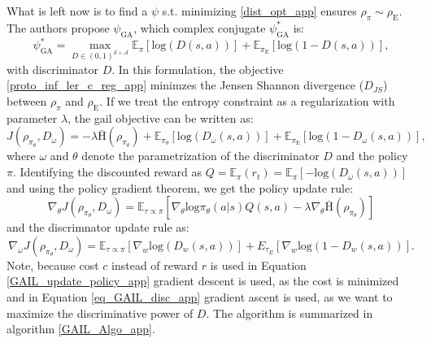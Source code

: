What is left now is to find a $\psi$ s.t. minimizing \ref{dist_opt_app} ensures $\rho_{\pi} \sim \rho_{\text{E}}$. The authors propose $\psi_{\text{GA}}$, 
which complex conjugate $\psi^*_{\text{GA}}$ is: 
\begin{equation}
    \psi^*_{\text{GA}} = \max_{D\in(0,1)^{\mathcal{S} \times \mathcal{A}}} \mathbb{E}_{\pi}\left[ \text{log}(D(s,a))\right] + \mathbb{E}_{\pi_{\text{E}}}\left[ \text{log}(1 - D(s,a))\right],
\end{equation}
with discriminator $D$. In this formulation, the objective \ref{proto_inf_ler_c_reg_app} minimzes the Jensen Shannon divergence ($D_{JS}$) between $\rho_\pi$ and $\rho_{\text{E}}$. If we treat the entropy constraint as a regularization with 
parameter $\lambda$, the \ac{gail} objective can be written as:
\begin{equation}
    J(\rho_{\pi_{\theta}}, D_{\omega}) = - \lambda  \bar{\text{H}}(\rho_{\pi_{\theta}} ) + \mathbb{E}_{\pi_{\theta}}\left[ \text{log}(D_{\omega}(s,a))\right] + \mathbb{E}_{\pi_{\text{E}}}\left[ \text{log}(1 - D_{\omega}(s,a))\right],
\end{equation}
where $\omega$ and $\theta$ denote the parametrization of the discriminator $D$ and the policy $\pi$. Identifying the discounted reward as $Q = \mathbb{E}_{\pi}(r_t) = \mathbb{E}_{\pi}\left[-\text{log}(D_{\omega}(s,a))\right]$ and using the policy 
gradient theorem, we get the policy update rule:
\begin{equation}
    \label{GAIL_update_policy_app}
    \nabla_{\theta} J(\rho_{\pi_{\theta}}, D_{\omega}) = \mathbb{E}_{\tau \propto \pi}\left[ \nabla_{\theta}\text{log}\pi_{\theta}(a|s) Q(s,a) -\lambda \nabla_{\theta}\bar{\text{H}}(\rho_{\pi_{\theta}} )  \right]
\end{equation}
and the discrimnator update rule as:
\begin{equation}
    \label{eq_GAIL_disc_app}
    \nabla_{\omega} J(\rho_{\pi_{\theta}}, D_{\omega}) = \mathbb{E}_{\tau \propto \pi} [\nabla_w \mathrm{log}(D_w(s,a))] + {E}_{\tau_E} [\nabla_w \mathrm{log}(1 - D_w(s,a))].
\end{equation}
Note, because cost $c$ instead of reward $r$ is used in Equation \ref{GAIL_update_policy_app} gradient descent is used, as the cost is minimized and in Equation \ref{eq_GAIL_disc_app} 
gradient ascent is used, as we want to maximize the discriminative power of $D$. The algorithm is summarized in algorithm \ref{GAIL_Algo_app}.\\
